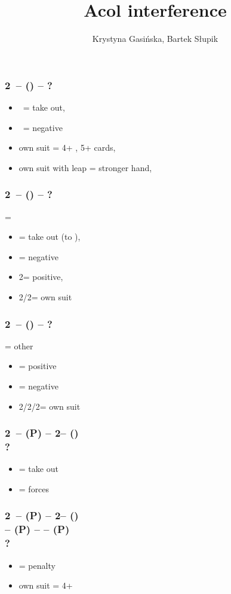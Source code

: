 \documentclass[12pt, a4paper]{article}
\title{Acol interference}
\author{Krystyna Gasińska, Bartek Słupik}
\begin{document}
\maketitle


\subsubsection*{2\clubs\ -- () -- ?}
\begin{itemize}
    \item \dbl\ = take out, \gf
    \item \pass\ = negative
    \item own suit = 4+ \hcp, 5+ cards, \gf
    \item own suit with leap = stronger hand, \gf
\end{itemize}

\subsubsection*{2\clubs\ -- (\dbl) -- ?}
\dbl = \clubs
\begin{itemize}
    \item \rdbl = take out (to \clubs), \gf \imp
    \item \pass = negative
    \item 2\diams = positive, \bal
    \item 2\hearts/2\spades = own suit
\end{itemize}

\subsubsection*{2\clubs\ -- (\dbl) -- ?}
\dbl = other
\begin{itemize}
    \item \rdbl = positive
    \item \pass = negative
    \item 2\diams/2\hearts/2\spades = own suit
\end{itemize}

\subsubsection*{2\clubs\ -- (P) -- 2\diams -- ()
                \\ ?}
\begin{itemize}
    \item \dbl = take out \imp
    \item \pass = forces \dbl
\end{itemize}

\subsubsection*{2\clubs\ -- (P) -- 2\diams -- ()
                \\  -- (P) -- \dbl -- (P)
                \\ ?}
\begin{itemize}
    \item \pass = penalty
    \item own suit = 4+ \imp
\end{itemize}

\end{document}
